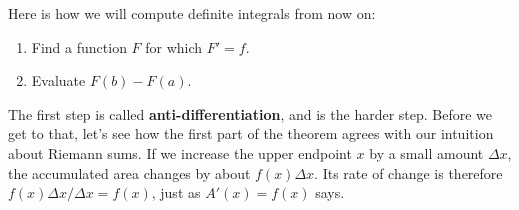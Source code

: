 Here is how we will compute definite integrals from now on:
\begin{enumerate}
    \item Find a function $F$ for which $F'=f$.
    \item Evaluate $F(b)-F(a).$
\end{enumerate}

The first step is called \textbf{anti-differentiation}, and is the harder step. Before we get to that, let's see how the first part of the theorem agrees with our intuition about Riemann sums. If we increase the upper endpoint $x$ by a small amount $\Delta x$, the accumulated area changes by about $f(x)\Delta x$. Its rate of change is therefore $f(x)\Delta x/\Delta x=f(x)$, just as $A'(x)=f(x)$ says. 








